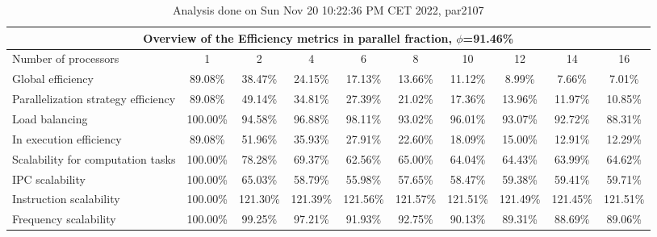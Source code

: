 \begin{table}[h]
\begin{center}
\begin{tabular}{|l|c|c|c|c|c|c|c|c|c|}
\hline
\multicolumn{10}{|c|}{Overview of the Efficiency metrics in parallel fraction, $\phi$=91.46\%} \\
\hline
\hline
Number of processors & 1 & 2 & 4 & 6 & 8 & 10 & 12 & 14 & 16 \\
\hline
\hline
Global efficiency                      &     89.08\% &     38.47\% &     24.15\% &     17.13\% &     13.66\% &     11.12\% &      8.99\% &      7.66\% &      7.01\% \\
\hline
\hline
Parallelization strategy efficiency &     89.08\% &     49.14\% &     34.81\% &     27.39\% &     21.02\% &     17.36\% &     13.96\% &     11.97\% &     10.85\% \\
\hline
Load balancing                   &    100.00\% &     94.58\% &     96.88\% &     98.11\% &     93.02\% &     96.01\% &     93.07\% &     92.72\% &     88.31\% \\
In execution efficiency          &     89.08\% &     51.96\% &     35.93\% &     27.91\% &     22.60\% &     18.09\% &     15.00\% &     12.91\% &     12.29\% \\
\hline
\hline
Scalability for computation tasks   &    100.00\% &     78.28\% &     69.37\% &     62.56\% &     65.00\% &     64.04\% &     64.43\% &     63.99\% &     64.62\% \\
\hline
IPC scalability                  &    100.00\% &     65.03\% &     58.79\% &     55.98\% &     57.65\% &     58.47\% &     59.38\% &     59.41\% &     59.71\% \\
Instruction scalability          &    100.00\% &    121.30\% &    121.39\% &    121.56\% &    121.57\% &    121.51\% &    121.49\% &    121.45\% &    121.51\% \\
Frequency scalability            &    100.00\% &     99.25\% &     97.21\% &     91.93\% &     92.75\% &     90.13\% &     89.31\% &     88.69\% &     89.06\% \\
\hline
\end{tabular}
\end{center}
\caption{ Analysis done on Sun Nov 20 10:22:36 PM CET 2022, par2107}
\end{table}
